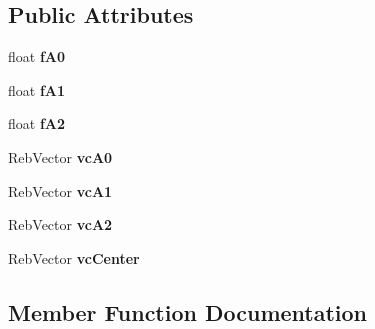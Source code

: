 \subsection*{Public Attributes}
\begin{DoxyCompactItemize}
\item 
float {\bfseries f\+A0}\hypertarget{class_reb_obb_acbfc847d26195d32c3a8f607dfb29fb9}{}\label{class_reb_obb_acbfc847d26195d32c3a8f607dfb29fb9}

\item 
float {\bfseries f\+A1}\hypertarget{class_reb_obb_af26a2bb0bcaa3798ee9a2f0eb419c07b}{}\label{class_reb_obb_af26a2bb0bcaa3798ee9a2f0eb419c07b}

\item 
float {\bfseries f\+A2}\hypertarget{class_reb_obb_aedb366a7d3cabb47e90e407063d3539c}{}\label{class_reb_obb_aedb366a7d3cabb47e90e407063d3539c}

\item 
Reb\+Vector {\bfseries vc\+A0}\hypertarget{class_reb_obb_a21a69f919cafecc54e3880c7bdab4c40}{}\label{class_reb_obb_a21a69f919cafecc54e3880c7bdab4c40}

\item 
Reb\+Vector {\bfseries vc\+A1}\hypertarget{class_reb_obb_a9281f9e1ead2218e721ff10918131587}{}\label{class_reb_obb_a9281f9e1ead2218e721ff10918131587}

\item 
Reb\+Vector {\bfseries vc\+A2}\hypertarget{class_reb_obb_a7260a7b9eadcfb59c917bc69be9ab87b}{}\label{class_reb_obb_a7260a7b9eadcfb59c917bc69be9ab87b}

\item 
Reb\+Vector {\bfseries vc\+Center}\hypertarget{class_reb_obb_a319e3f9bfdab87c0278d6dbf1d1f52c2}{}\label{class_reb_obb_a319e3f9bfdab87c0278d6dbf1d1f52c2}

\end{DoxyCompactItemize}


\subsection{Member Function Documentation}
